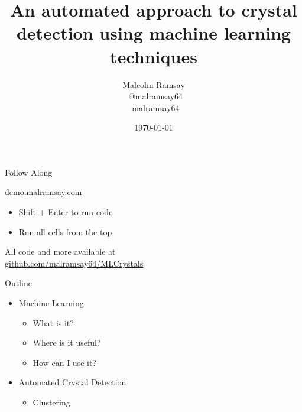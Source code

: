 \documentclass[aspectratio=169, 14pt]{beamer}
\title{\large An automated approach to crystal detection using machine learning techniques}
\date{\today}
\author[Malcolm]{Malcolm Ramsay \\ \faTwitter~@malramsay64 \\ \faGithub~malramsay64}
\begin{document}
\begin{frame}
  {\fontsize{12}{14}\selectfont
  \titlepage{}
}
\end{frame}

\begin{frame}{Follow Along}
  \begin{center}
    \LARGE
    \url{demo.malramsay.com}
  \end{center}

  \begin{itemize}
    \item Shift + Enter to run code
    \item Run all cells from the top
  \end{itemize}

  All code and more available at \\
  \url{github.com/malramsay64/MLCrystals}

\end{frame}


\begin{frame}{Outline}

  \begin{itemize}
    \item Machine Learning
      \begin{itemize}
        \item What is it?
        \item Where is it useful?
        \item How can I use it?
      \end{itemize}
    \item Automated Crystal Detection
      \begin{itemize}
        \item Clustering
      \end{itemize}
  \end{itemize}
\end{frame}
\end{document}

